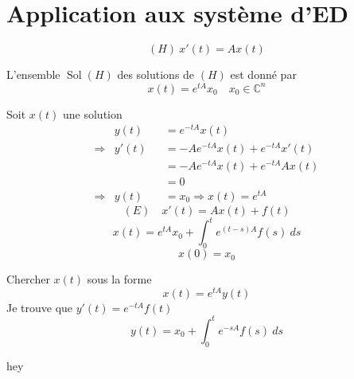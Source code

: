 \documentclass[a4paper]{report}
\let\implies\Rightarrow
\theoremstyle{definition}
\begin{document}
\section{Application aux système d'ED}
\[
    (H) \: x'(t) = Ax(t)
\] 
\begin{theorem}
    L'ensemble $\operatorname{Sol}(H)$ des solutions de  $(H)$ est donné par
     \[
         x(t) = e^{tA}x_0 \quad x_0 \in \mathbb{C}^{n}
    \] 
\end{theorem}
Soit $x(t)$ une solution
\begin{align*}
            & y(t)  &&= e^{-tA}x(t)\\
    \implies& y'(t) &&= -Ae^{-tA}x(t) + e^{-tA}x'(t)\\
            &       &&= -Ae^{-tA}x(t) + e^{-tA}Ax(t)\\
            &       &&= 0\\
    \implies& y(t)  && = x_0 \implies x(t) = e^{tA}
\end{align*}
\[
    (E) \quad x'(t) = Ax(t) + f(t)
\] 
\[
    x(t) = e^{tA}x_0 + \int_{{0}}^{{t}} {e^{(t - s)A} f(s)} \: d{s} 
\] 
\[
x(0) = x_0
\] 
\begin{preuve}
   Chercher $x(t)$  sous la forme 
   \[
       x(t) = e^{tA}y(t)
   \] 
   Je trouve que $y'(t) = e^{-tA}f(t)$
    \[
        y(t) = x_0 + \int_{{0}}^{{t}} {e^{-sA}f(s)} \: d{s}
   \] 
\end{preuve}
hey

% 

\nocite{*}
\printbibliography
\end{document}
